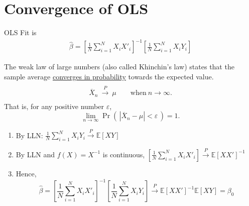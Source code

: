 \documentclass[11pt]{elegantbook}
\begin{document}
\section{Convergence of OLS}
OLS Fit is
\begin{equation}
    \begin{aligned}
        \hat{\beta}=\left[\frac{1}{N}\sum_{i=1}^N X_i X'_i\right]^{-1}\left[\frac{1}{N}\sum_{i=1}^N X_iY_i\right]
    \end{aligned}
    \nonumber
\end{equation}
\begin{theorem}
    The weak law of large numbers (also called Khinchin's law) states that the sample average \underline{converges in probability} towards the expected value.
    $${\displaystyle {\begin{matrix}{}\\{\overline {X}}_{n}\ {\xrightarrow {P}}\ \mu \qquad {\text{when}}\ n\to \infty .\\{}\end{matrix}}}$$
    That is, for any positive number $\varepsilon$,
    $${\displaystyle \lim _{n\to \infty }\Pr \!\left(\,|{\overline {X}}_{n}-\mu |<\varepsilon \,\right)=1.}$$
\end{theorem}
\begin{enumerate}
    \item By LLN: $\frac{1}{N}\sum_{i=1}^N X_iY_i\xrightarrow{P} \mathbb{E}[XY]$
    \item By LLN and $f(X)=X^{-1}$ is continuous, $\left[\frac{1}{N}\sum_{i=1}^N X_iX'_i\right]\xrightarrow{P} \mathbb{E}[XX']^{-1}$
    \item Hence, $$\hat{\beta}=\left[\frac{1}{N}\sum_{i=1}^N X_i X'_i\right]^{-1}\left[\frac{1}{N}\sum_{i=1}^N X_iY_i\right] \xrightarrow{P} \mathbb{E}[XX']^{-1}\mathbb{E}[XY]= \beta_0$$
\end{enumerate}
\end{document}
